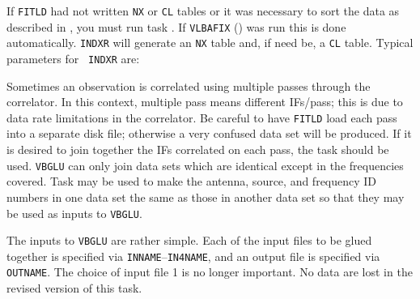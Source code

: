 If {\tt FITLD} had not written {\tt NX} or {\tt CL} tables or it was
necessary to sort the data as described in , you must run
task {\tt {}}\@.  If {\tt VLBAFIX} ()  was
run this is done automatically.  {\tt INDXR} will generate an {\tt NX}
table and, if need be, a {\tt CL} table. Typical parameters for {\tt
INDXR} are:


Sometimes an observation is correlated using multiple passes through
the  correlator.  In this context, multiple pass means
different IFs/pass; this is due to data rate limitations in the
correlator.  Be careful to have {\tt FITLD} load each pass into a
separate disk file; otherwise a very confused data set will be
produced.  If it is desired to join together the IFs correlated on
each pass, the task {\tt {}} should be used.  {\tt VBGLU}
can only join data sets which are identical except in the frequencies
covered.  Task {\tt {}} may be used to make the antenna,
source, and frequency ID numbers in one data set the same as those in
another data set so that they may be used as inputs to {\tt VBGLU}\@.

The inputs to {\tt VBGLU} are rather simple.  Each of the input files
to be glued together is specified via {\tt INNAME}--{\tt IN4NAME},
and an output file is specified via {\tt OUTNAME}\@.  The choice
of input file 1 is no longer important.  No data
are lost in the revised version of this task.
\pd

